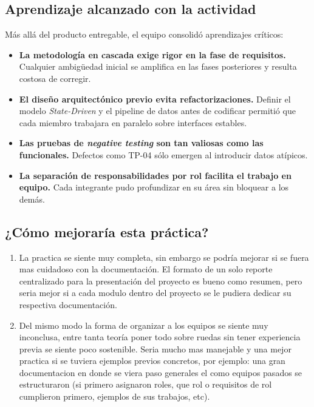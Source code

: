 \documentclass[11pt,letterpaper,oneside]{article}
\begin{document}
\subsection{Aprendizaje alcanzado con la actividad}

Más allá del producto entregable, el equipo consolidó aprendizajes críticos:

\begin{itemize}[leftmargin=1.5em,itemsep=2pt]
  \item \textbf{La metodología en cascada exige rigor en la fase de requisitos.} Cualquier ambigüedad inicial se amplifica en las fases posteriores y resulta costosa de corregir.
  \item \textbf{El diseño arquitectónico previo evita refactorizaciones.} Definir el modelo \emph{State-Driven} y el pipeline de datos antes de codificar permitió que cada miembro trabajara en paralelo sobre interfaces estables.
  \item \textbf{Las pruebas de \emph{negative testing} son tan valiosas como las funcionales.} Defectos como TP-04 sólo emergen al introducir datos atípicos.
  \item \textbf{La separación de responsabilidades por rol facilita el trabajo en equipo.} Cada integrante pudo profundizar en su área sin bloquear a los demás.
\end{itemize}

\subsection{¿Cómo mejoraría esta práctica?}



\begin{enumerate}[leftmargin=1.5em,itemsep=2pt]
  \item La practica se siente muy completa, sin embargo se podría mejorar si se fuera mas cuidadoso con la documentación. El formato de un solo reporte centralizado para la presentación del proyecto es bueno como resumen, pero seria mejor si a cada modulo dentro del proyecto se le pudiera dedicar su respectiva documentación.
  \item Del mismo modo la forma de organizar a los equipos se siente muy inconclusa, entre tanta teoría poner todo sobre ruedas sin tener experiencia previa se siente poco sostenible. Seria mucho mas manejable y una mejor practica si se tuviera ejemplos previos concretos, por ejemplo: una gran documentacion en donde se viera paso generales el como equipos pasados se estructuraron (si primero asignaron roles, que rol o requisitos de rol cumplieron primero, ejemplos de sus trabajos, etc).
\end{enumerate}
\end{document}
